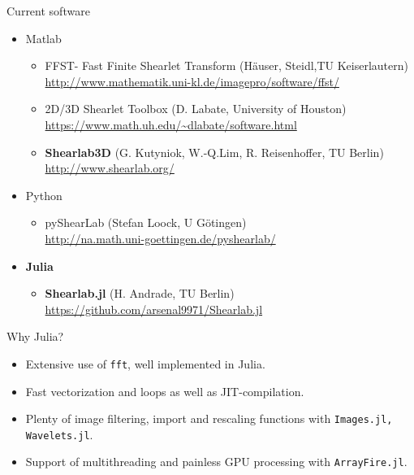 \begin{frame}{Current software}
\begin{itemize}
\item{Matlab}
\begin{itemize}
	\item FFST- Fast Finite Shearlet Transform (H\"auser, Steidl,TU Keiserlautern)\\ \url{http://www.mathematik.uni-kl.de/imagepro/software/ffst/}
	\item 2D/3D Shearlet Toolbox (D. Labate, University of Houston)\\ \url{https://www.math.uh.edu/~dlabate/software.html}
	\item \textbf{Shearlab3D} (G. Kutyniok, W.-Q.Lim, R. Reisenhoffer, TU Berlin)\\\url{http://www.shearlab.org/}
\end{itemize}

\item{Python}
\begin{itemize}
	\item pyShearLab (Stefan Loock, U G\"otingen) \\ \url{http://na.math.uni-goettingen.de/pyshearlab/}
\end{itemize}

\item{\textbf{Julia}}
\begin{itemize}
\item \textbf{Shearlab.jl} (H. Andrade, TU Berlin) \\ \url{https://github.com/arsenal9971/Shearlab.jl}
\end{itemize}
\end{itemize}
\end{frame}

\begin{frame}{Why Julia?}
\begin{itemize}
\item Extensive use of \lstinline[language=julia]{fft}, well implemented in Julia.

\bigskip

\item Fast vectorization and loops as well as JIT-compilation.

\bigskip

\item Plenty of image filtering, import and rescaling functions with  \lstinline[language=julia]{Images.jl, Wavelets.jl}.

\bigskip

\item Support of multithreading and painless GPU processing with  \lstinline[language=julia]{ArrayFire.jl}.
\end{itemize}
\end{frame}

